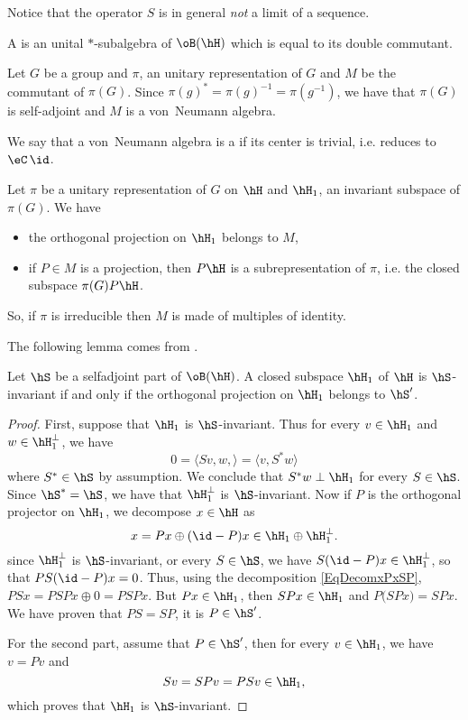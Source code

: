 Notice that the operator $S$ is in general \emph{not} a limit of a sequence.

\begin{definition}
A  is an unital $*$-subalgebra of $\oB(\hH)$ which is equal to its double commutant.
\end{definition}

Let $G$ be a group and $\pi$, an unitary representation of $G$ and $M$ be the commutant of $\pi(G)$. Since $\pi(g)^*=\pi(g)^{-1}=\pi(g^{-1})$, we have that $\pi(G)$ is self-adjoint and $M$ is a von~Neumann algebra.

We say that a von~Neumann algebra is a  if its center is trivial, i.e. reduces to $\eC\,\id$.

\begin{proposition}	\label{PropprojrepresVN}
Let $\pi$ be a unitary representation of $G$ on $\hH$ and $\hH_1$, an invariant subspace of $\pi(G)$. We have
\begin{itemize}
\item the orthogonal projection on $\hH_1$ belongs to $M$,
\item if $P\in M$ is a projection, then $P\hH$ is a subrepresentation of $\pi$, i.e. the closed subspace $\pi(G)P\hH$.
\end{itemize}
\end{proposition}
So, if $\pi$ is irreducible then $M$ is made of multiples of identity.

The following lemma comes from \cite{Wassermann}.
\begin{lemma}		\label{LeminvarMprime}
Let $\hS$ be a selfadjoint part of $\oB(\hH)$. A closed subspace $\hH_1$ of $\hH$ is $\hS$-invariant if and only if the orthogonal projection on $\hH_1$ belongs to $\hS'$.
\end{lemma}

\begin{proof}
First, suppose that $\hH_1$ is $\hS$-invariant. Thus for every $v\in\hH_1$ and $w\in \hH_1^{\perp}$, we have
\[ 
  0=\langle Sv,w, \rangle =\langle v, S^*w\rangle 
\]
where $S^*\in\hS$ by assumption. We conclude that $S^*w\perp\hH_1$ for every $S\in\hS$. Since $\hS^*=\hS$, we have that $\hH_1^{\perp}$ is $\hS$-invariant. Now if $P$ is the orthogonal projector on $\hH_1$, we decompose $x\in\hH$ as
\begin{equation}		\label{EqDecomxPxSP}
  x=Px\oplus(\id-P)x\in\hH_1\oplus\hH_1^{\perp}.
\end{equation}
since $\hH_1^{\perp}$ is $\hS$-invariant, or every $S\in\hS$, we have $S(\id-P)x\in\hH_1^{\perp}$, so that $PS(\id-P)x=0$. Thus, using the decomposition \eqref{EqDecomxPxSP}, $PSx=PSPx\oplus 0=PSPx$. But $Px\in \hH_1$, then $SPx\in\hH_1$ and $P\big( SPx \big)=SPx$. We have proven that $PS=SP$, it is $P\in\hS'$.

For the second part, assume that $P\in\hS'$, then for every $v\in\hH_1$, we have $v=Pv$ and
\[ 
  Sv=SPv=PSv\in\hH_1,
\]
which proves that $\hH_1$ is $\hS$-invariant.
\end{proof}


